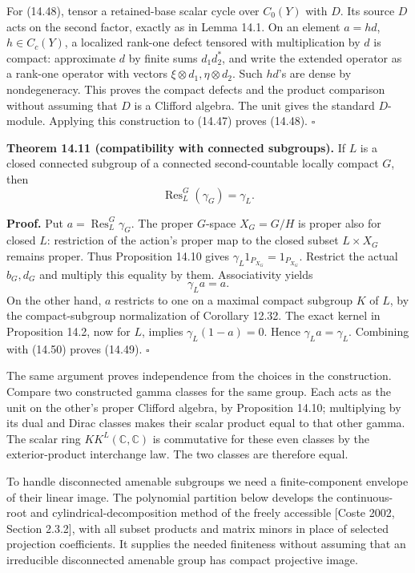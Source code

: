 \documentclass[
  11pt,
]{article}
\begin{document}
For (14.48), tensor a retained-base scalar cycle over \(C_0(Y)\) with
\(D\). Its source \(D\) acts on the second factor, exactly as in Lemma
14.1. On an element \(a=hd\), \(h\in C_c(Y)\), a localized rank-one
defect tensored with multiplication by \(d\) is compact: approximate
\(d\) by finite sums \(d_1d_2^*\), and write the extended operator as a
rank-one operator with vectors \(\xi\otimes d_1,\eta\otimes d_2\). Such
\(hd\)'s are dense by nondegeneracy. This proves the compact defects and
the product comparison without assuming that \(D\) is a Clifford
algebra. The unit gives the standard \(D\)-module. Applying this
construction to (14.47) proves (14.48). \(\square\)

\textbf{Theorem 14.11 (compatibility with connected subgroups).} If
\(L\) is a closed connected subgroup of a connected second-countable
locally compact \(G\), then \[
\operatorname{Res}^G_L(\gamma_G)=\gamma_L.
\tag{14.49}
\]

\textbf{Proof.} Put \(a=\operatorname{Res}^G_L\gamma_G\). The proper
\(G\)-space \(X_G=G/H\) is proper also for closed \(L\): restriction of
the action's proper map to the closed subset \(L\times X_G\) remains
proper. Thus Proposition 14.10 gives
\(\gamma_L1_{P_{X_G}}=1_{P_{X_G}}\). Restrict the actual \(b_G,d_G\) and
multiply this equality by them. Associativity yields \[
\gamma_L a=a.
\tag{14.50}
\] On the other hand, \(a\) restricts to one on a maximal compact
subgroup \(K\) of \(L\), by the compact-subgroup normalization of
Corollary 12.32. The exact kernel in Proposition 14.2, now for \(L\),
implies \(\gamma_L(1-a)=0\). Hence \(\gamma_La=\gamma_L\). Combining
with (14.50) proves (14.49). \(\square\)

The same argument proves independence from the choices in the
construction. Compare two constructed gamma classes for the same group.
Each acts as the unit on the other's proper Clifford algebra, by
Proposition 14.10; multiplying by its dual and Dirac classes makes their
scalar product equal to that other gamma. The scalar ring
\(KK^L(\mathbb C,\mathbb C)\) is commutative for these even classes by
the exterior-product interchange law. The two classes are therefore
equal.

To handle disconnected amenable subgroups we need a finite-component
envelope of their linear image. The polynomial partition below develops
the continuous-root and cylindrical-decomposition method of the freely
accessible {[}Coste 2002, Section 2.3.2{]}, with all subset products and
matrix minors in place of selected projection coefficients. It supplies
the needed finiteness without assuming that an irreducible disconnected
amenable group has compact projective image.
\end{document}
